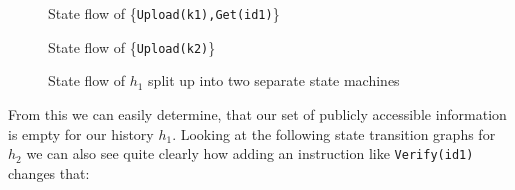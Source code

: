 \begin{figure}[H]
    \begin{minipage}[t]{0.5\textwidth}
        \centering
        \caption*{State flow of \{\texttt{Upload(k1),Get(id1)}\}}
    \end{minipage}
    \begin{minipage}[t]{0.5\textwidth}
        \centering
        \caption*{State flow of \{\texttt{Upload(k2)}\}}
    \end{minipage}
    \caption{State flow of $h_{1}$ split up into two separate state machines }
\end{figure}
From this we can easily determine, that our set of publicly accessible information is empty for our history $h_1$. Looking at the following state transition graphs for $h_2$ we can also see quite clearly how adding an instruction like \texttt{Verify(id1)} changes that:

